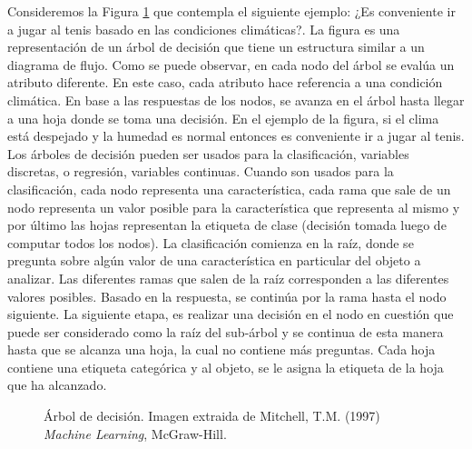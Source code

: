 	Consideremos la Figura \ref{fig: Arbol de decision} que contempla el siguiente ejemplo: ¿Es conveniente ir a jugar al tenis basado en las condiciones climáticas?. La figura es una representación de un árbol de decisión que tiene un estructura similar a un diagrama de flujo. Como se puede observar, en cada nodo del árbol se evalúa un atributo diferente. En este caso, cada atributo hace referencia a una condición climática. En base a las respuestas de los nodos, se avanza en el árbol hasta llegar a una hoja donde se toma una decisión. En el ejemplo de la figura, si el clima está despejado y la humedad es normal entonces es conveniente ir a jugar al tenis. Los árboles de decisión pueden ser usados para la clasificación, variables discretas, o regresión, variables continuas. Cuando son usados para la clasificación, cada nodo representa una ca\-ra\-cte\-rís\-ti\-ca, cada rama que sale de un nodo representa un valor posible para la característica que representa al mismo y por último las hojas representan la etiqueta de clase (decisión tomada luego de computar todos los nodos). La clasificación comienza en la raíz, donde se pregunta sobre algún valor de una característica en particular del objeto a analizar. Las diferentes ramas que salen de la  raíz corresponden a las diferentes valores posibles. Basado en la respuesta, se continúa por la rama hasta el nodo siguiente. La siguiente etapa, es realizar una decisión en el nodo en cuestión que puede ser con\-si\-de\-ra\-do como la raíz del sub-árbol y se continua de esta manera hasta que se alcanza una hoja, la cual no contiene más preguntas. Cada hoja contiene una etiqueta categórica y al objeto, se le asigna la etiqueta de la hoja que ha alcanzado.
	
		\begin{figure}[htbp]
			\centering
			\caption[Árbol de decisión]{Árbol de decisión. Imagen extraida de Mitchell, T.M. (1997) \textit{Machine Learning}, McGraw-Hill.}
			\label{fig: Arbol de decision}
		\end{figure}
		
